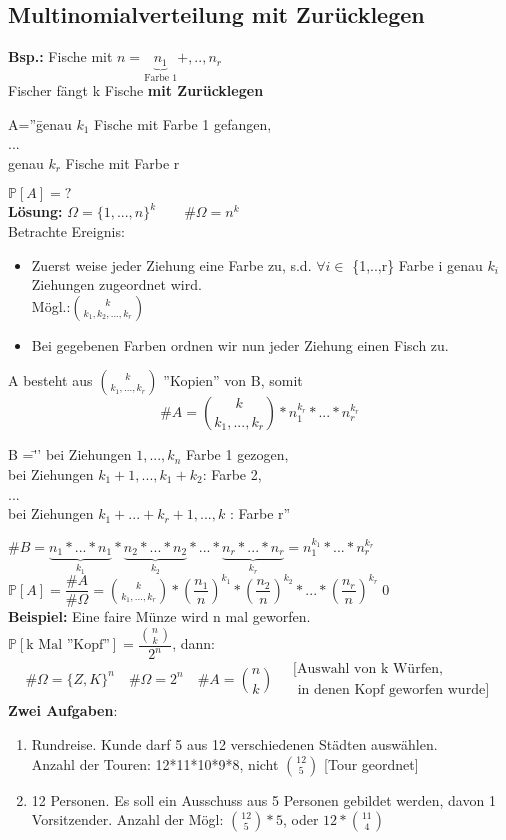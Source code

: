  	 \subsection{Multinomialverteilung mit Zurücklegen}
 	 \textbf{Bsp.:} Fische mit $n = \underbrace{n_1}_\text{Farbe 1}+,..,n_r$\\
 	 Fischer fängt k Fische \textbf{mit Zurücklegen}\\
\begin{tabbing}
	 	 A=''\= genau $k_1$ Fische mit Farbe 1 gefangen,\\
	 	 \> ...\\
	 	 \> genau $k_r$ Fische mit Farbe r
\end{tabbing}
$\mathds{P}[A] = ?$\medskip\\
\textbf{Lösung:} $\Omega = \{1,...,n\}^k \qquad \#\Omega = n^k$\\
Betrachte Ereignis:
\begin{itemize}
	\item Zuerst weise jeder Ziehung eine Farbe zu, s.d. $\forall i \in $ \{1,..,r\} Farbe i genau $k_i$ Ziehungen zugeordnet wird.\\Mögl.:$\binom{k}{k_1,k_2,...,k_r}$
	\item Bei gegebenen Farben ordnen wir nun jeder Ziehung einen Fisch zu.
\end{itemize}
A besteht aus $\binom{k}{k_1,...,k_r}$ ''Kopien'' von B, somit
$$\#A = \binom{k}{k_1,...,k_r}*n_1^{k_r}*...*n_r^{k_r}$$
\begin{tabbing}
	B =\= '' bei Ziehungen $1,...,k_n$ Farbe 1 gezogen,\\
	\> bei Ziehungen $k_1+1,...,k_1+k_2$: Farbe 2,\\
	\>...\\
	\> bei Ziehungen $k_1+...+k_r+1,...,k$ : Farbe r''
\end{tabbing}
$\#B=\underbrace{n_1*...*n_1}_{k_1}*\underbrace{n_2*...*n_2}_{k_2}*...*\underbrace{n_r*...*n_r}_{k_r} = n_1^{k_1}*...*n_r^{k_r}$\medskip\\
$\mathds{P}[A] = \dfrac{\#A}{\#\Omega}= \binom{k}{k_1,...,k_r}*\left(\dfrac{n_1}{n}\right)^{k_1}*\left(\dfrac{n_2}{n}\right)^{k_2}*...*\left(\dfrac{n_r}{n}\right)^{k_r}$\qed\medskip\\
\textbf{Beispiel:} Eine faire Münze wird n mal geworfen.\\ $\mathds{P}[\text{k Mal ''Kopf''}]= \dfrac{\binom{n}{k}}{2^n}$, dann: 
$$\#\Omega = \{Z, K\}^n\quad \#\Omega = 2^n\quad \#A=\binom{n}{k} \quad \substack{\text{[Auswahl von k Würfen,}\\\text{ in denen Kopf geworfen wurde]}}$$\newpage
\textbf{Zwei Aufgaben}:
\begin{enumerate}
	\item Rundreise. Kunde darf 5 aus 12 verschiedenen Städten auswählen.\\Anzahl der Touren: 12*11*10*9*8, nicht $\binom{12}{5}$ [Tour geordnet]
	\item 12 Personen. Es soll ein Ausschuss aus 5 Personen gebildet werden, davon 1 Vorsitzender. Anzahl der Mögl: $\binom{12}{5}*5$, oder $12*\binom{11}{4}$\end{enumerate}
 	 